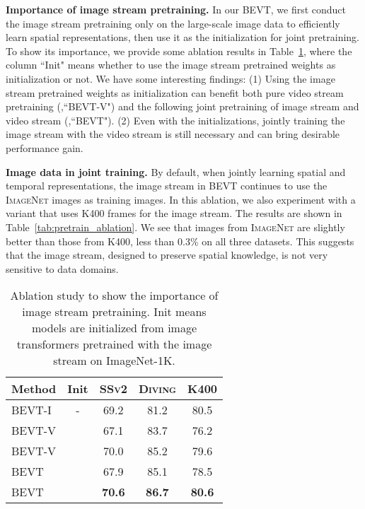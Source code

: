 \documentclass[10pt,twocolumn,letterpaper]{article}
\makeatletter
\newcommand*{\system}{BEVT\@\xspace}
\newcommand{\ssv}{{\scshape SSv2}\xspace}
\newcommand{\diving}{{\scshape Diving\-48}\xspace}
\newcommand{\kn}{{\scshape K400}\xspace}
\newcommand{\inet}{{\scshape ImageNet}\xspace}
\newcommand{\ra}[1]{\renewcommand{\arraystretch}{#1}}
\makeatother
\begin{document}
\vspace{0.05in}
\noindent\textbf{Importance of image stream pretraining.} In our \system, we first conduct the image stream pretraining  only on the large-scale image data to efficiently learn spatial representations, then use it as the initialization for joint pretraining. To show its importance, we provide some ablation results in Table~\ref{tab:init_ablation}, where the column ``Init" means whether to use the image stream pretrained weights as initialization or not. We have some interesting findings: (1) Using the image stream pretrained weights as initialization can benefit both pure video stream pretraining (\ie,``BEVT-V") and the following joint pretraining of image stream and video stream (\ie,``BEVT"). (2) Even with the initializations, jointly training the image stream with the video stream is still necessary and can bring desirable performance gain. 

\vspace{0.05in}
\noindent\textbf{Image data in joint training.} By default, when jointly learning spatial and temporal representations, the image stream in \system continues to use the \inet images as training images. In this ablation, we also experiment with a variant that uses \kn frames for the image stream. The results are shown in Table~\ref{tab:pretrain_ablation}. We see that images from \inet are slightly better than those from \kn, \ie less than 0.3\% on all three datasets. This suggests that the image stream, designed to preserve spatial knowledge, is not very sensitive to data domains.




\begin{table}[t]
  \centering

\ra{1.0}
  \setlength{\tabcolsep}{0pt} \begin{tabular*}{\linewidth}{@{\extracolsep{\fill}}lcccc@{}}
    \toprule
    Method & Init & \ssv & \diving & \kn \\
    \midrule
    BEVT-I & - & 69.2 & 81.2 & 80.5 \\
    \midrule
    BEVT-V  &  & 67.1 & 83.7 & 76.2 \\
    BEVT-V  &  & 70.0 & 85.2 & 79.6 \\
    \midrule
    BEVT  &  & 67.9 & 85.1 & 78.5 \\
    BEVT  &  & \textbf{70.6} & \textbf{86.7} & \textbf{80.6} \\
    \bottomrule
  \end{tabular*}
  \caption{Ablation study to show the importance of image stream pretraining. Init means models are initialized from image transformers pretrained with the image stream on ImageNet-1K.}
\label{tab:init_ablation}
  \vspace{-1em}
\end{table}
\end{document}
